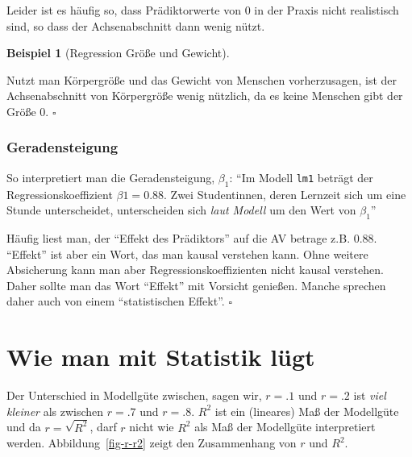 \documentclass[
  letterpaper,
]{scrbook}
\theoremstyle{definition}
\theoremstyle{definition}
\newtheorem{example}{Beispiel}[chapter]
\theoremstyle{definition}
\theoremstyle{remark}
\begin{document}
Leider ist es häufig so, dass Prädiktorwerte von 0 in der Praxis nicht
realistisch sind, so dass der Achsenabschnitt dann wenig nützt.

\begin{example}[Regression Größe und
Gewicht]\protect\hypertarget{exm-groesse}{}\label{exm-groesse}

Nutzt man Körpergröße und das Gewicht von Menschen vorherzusagen, ist
der Achsenabschnitt von Körpergröße wenig nützlich, da es keine Menschen
gibt der Größe 0. \(\square\)

\end{example}

\subsubsection{Geradensteigung}\label{geradensteigung}

So interpretiert man die Geradensteigung, \(\beta_1\): \enquote{Im
Modell \texttt{lm1} beträgt der Regressionskoeffizient
\(\beta1 = 0.88\). Zwei Studentinnen, deren Lernzeit sich um eine Stunde
unterscheidet, unterscheiden sich \emph{laut Modell} um den Wert von
\(\beta_1\)}

\begin{tcolorbox}[enhanced jigsaw, colbacktitle=quarto-callout-caution-color!10!white, toptitle=1mm, colframe=quarto-callout-caution-color-frame, breakable, toprule=.15mm, bottomrule=.15mm, bottomtitle=1mm, left=2mm, opacitybacktitle=0.6, colback=white, arc=.35mm, coltitle=black, title=\textcolor{quarto-callout-caution-color}{\faFire}\hspace{0.5em}{Vorsicht}, opacityback=0, rightrule=.15mm, leftrule=.75mm, titlerule=0mm]

Häufig liest man, der \enquote{Effekt des Prädiktors} auf die AV betrage
z.B. \(0.88\). \enquote{Effekt} ist aber ein Wort, das man kausal
verstehen kann. Ohne weitere Absicherung kann man aber
Regressionskoeffizienten nicht kausal verstehen. Daher sollte man das
Wort \enquote{Effekt} mit Vorsicht genießen. Manche sprechen daher auch
von einem \enquote{statistischen Effekt}. \(\square\)

\end{tcolorbox}

\section{Wie man mit Statistik
lügt}\label{wie-man-mit-statistik-luxfcgt-4}

Der Unterschied in Modellgüte zwischen, sagen wir, \(r=.1\) und \(r=.2\)
ist \emph{viel kleiner} als zwischen \(r=.7\) und \(r=.8\). \(R^2\) ist
ein (lineares) Maß der Modellgüte und da \(r = \sqrt{R^2}\), darf \(r\)
nicht wie \(R^2\) als Maß der Modellgüte interpretiert werden.
Abbildung~\ref{fig-r-r2} zeigt den Zusammenhang von \(r\) und \(R^2\).
\end{document}
